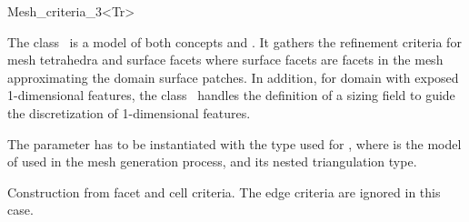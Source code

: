 \ccRefPageBegin


\begin{ccRefClass}{Mesh_criteria_3<Tr>}  %


\ccDefinition
  
The class \ccRefName\ is a model of both concepts 
and .
It gathers the refinement criteria for mesh tetrahedra and
surface facets where 
surface facets  are facets in the mesh approximating the domain surface patches.
In addition, for domain with exposed 1-dimensional features, 
the class  \ccRefName\ 
 handles the definition of  a sizing field to guide the discretization of 
 1-dimensional features.


\ccParameters
The parameter  has to be instantiated with the type used for
\ccc{C3T3::Triangulation},  
where  is the model of 
used in the mesh generation process,
and   its nested triangulation type.


\ccIsModel
{}


\ccTypes

\ccGlue
{}
\ccGlue
{}


\ccCreation
{}  %

{Construction from facet and cell criteria. The edge criteria are ignored
in this case.}


\end{ccRefClass}

